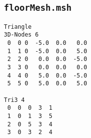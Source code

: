 \subsection{\texttt{floorMesh.msh}}\label{code:floorMesh}
\begin{verbatim}
Triangle
3D-Nodes 6
 0  0 0  -5.0  0.0   0.0
 1  1 0  -5.0  0.0   5.0
 2  2 0   0.0  0.0  -5.0
 3  3 0   0.0  0.0   0.0
 4  4 0   5.0  0.0  -5.0
 5  5 0   5.0  0.0   5.0

Tri3 4
 0  0  0  3  1
 1  0  1  3  5
 2  0  5  3  4
 3  0  3  2  4
\end{verbatim}

